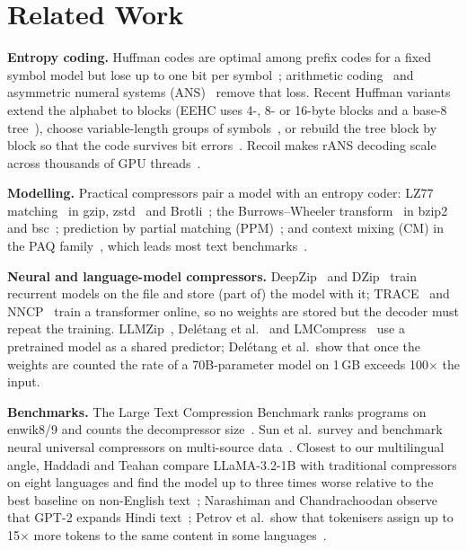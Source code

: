 \documentclass[conference]{IEEEtran}
\begin{document}
\section{Related Work}
\textbf{Entropy coding.} Huffman codes are optimal among prefix codes for a fixed symbol model but lose up to one bit per symbol~\cite{huffman1952}; arithmetic coding~\cite{witten1987} and asymmetric numeral systems (ANS)~\cite{duda2013ans} remove that loss. Recent Huffman variants extend the alphabet to blocks (EEHC uses 4-, 8- or 16-byte blocks and a base-8 tree~\cite{yeful2026eehc}), choose variable-length groups of symbols~\cite{tu2022v2v}, or rebuild the tree block by block so that the code survives bit errors~\cite{klein2024dynhuff}. Recoil makes rANS decoding scale across thousands of GPU threads~\cite{lin2023recoil}.

\textbf{Modelling.} Practical compressors pair a model with an entropy coder: LZ77 matching~\cite{ziv1977} in gzip, zstd~\cite{rfc8878} and Brotli~\cite{alakuijala2019brotli}; the Burrows--Wheeler transform~\cite{burrows1994} in bzip2 and bsc~\cite{grebnov_bsc}; prediction by partial matching (PPM)~\cite{cleary1984}; and context mixing (CM) in the PAQ family~\cite{mahoney2005paq,paq8px}, which leads most text benchmarks~\cite{mahoney_ltcb}.

\textbf{Neural and language-model compressors.} DeepZip~\cite{goyal2019deepzip} and DZip~\cite{goyal2021dzip} train recurrent models on the file and store (part of) the model with it; TRACE~\cite{mao2022trace} and NNCP~\cite{bellard2019nncp,bellard2021nncpv2} train a transformer online, so no weights are stored but the decoder must repeat the training. LLMZip~\cite{valmeekam2023llmzip}, Del\'etang et al.~\cite{deletang2024lmic} and LMCompress~\cite{li2025lmcompress} use a pretrained model as a shared predictor; Del\'etang et al.\ show that once the weights are counted the rate of a 70B-parameter model on 1\,GB exceeds 100$\times$ the input.

\textbf{Benchmarks.} The Large Text Compression Benchmark ranks programs on enwik8/9 and counts the decompressor size~\cite{mahoney_ltcb}. Sun et al.\ survey and benchmark neural universal compressors on multi-source data~\cite{sun2025nnlcb}. Closest to our multilingual angle, Haddadi and Teahan compare LLaMA-3.2-1B with traditional compressors on eight languages and find the model up to three times worse relative to the best baseline on non-English text~\cite{haddadi2026comparing}; Narashiman and Chandrachoodan observe that GPT-2 expands Hindi text~\cite{narashiman2024alphazip}; Petrov et al.\ show that tokenisers assign up to 15$\times$ more tokens to the same content in some languages~\cite{petrov2023tokenizers}.
\end{document}
